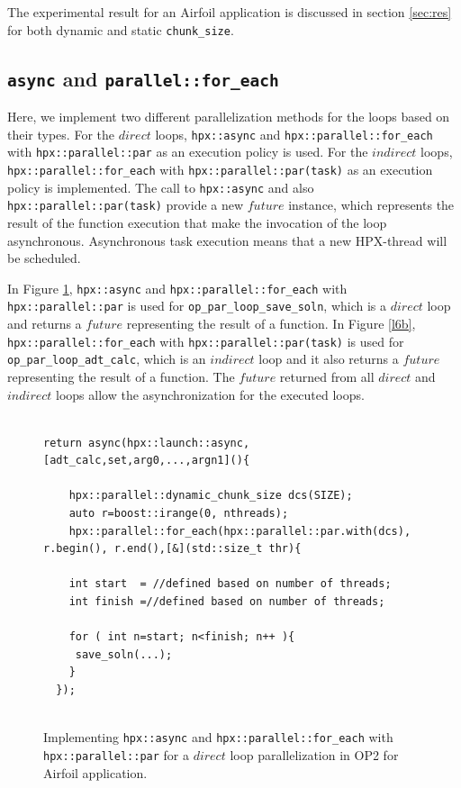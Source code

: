 \documentclass[conference]{IEEEtran}
\begin{document}
The experimental result for an Airfoil application is discussed in section \ref{sec:res} for both dynamic and static \texttt{chunk\_size}.

\subsection{\texttt{async} and \texttt{parallel::for\_each}}
\label{sec:async}

Here, we implement two different parallelization methods for the loops based on their types. For the $direct$ loops, \texttt{hpx::async} and \texttt{hpx::parallel::for\_each} with \texttt{hpx::parallel::par} as an execution policy is used. For  the $indirect$ loops,  \texttt{hpx::parallel::for\_each} with \texttt{hpx::parallel::par(task)} as an execution policy is implemented. The call to \texttt{hpx::async} and also \texttt{hpx::parallel::par(task)} provide a new $future$ instance, which represents the result of the function execution that make the invocation of the loop asynchronous. Asynchronous task execution means that a new HPX-thread will be scheduled. 

In Figure \ref{l6}, \texttt{hpx::async} and \texttt{hpx::parallel::for\_each} with \texttt{hpx::parallel::par} is used for \texttt{op\_par\_loop\_save\_soln}, which is a $direct$ loop and returns a $future$ representing the result of a function. In Figure \ref{l6b},  \texttt{hpx::parallel::for\_each} with \texttt{hpx::parallel::par(task)} is used for \texttt{op\_par\_loop\_adt\_calc}, which is an $indirect$ loop and it also returns a $future$ representing the result of a function. The $future$ returned from all $direct$ and $indirect$ loops allow the asynchronization for the executed loops.

\begin{figure} [!h]
    \begin{lstlisting}    

return async(hpx::launch::async,[adt_calc,set,arg0,...,argn1](){

    hpx::parallel::dynamic_chunk_size dcs(SIZE);
    auto r=boost::irange(0, nthreads);
    hpx::parallel::for_each(hpx::parallel::par.with(dcs), r.begin(), r.end(),[&](std::size_t thr){
  
    int start  = //defined based on number of threads;
    int finish =//defined based on number of threads;
        
    for ( int n=start; n<finish; n++ ){
     save_soln(...);
    }
  });
  
    \end{lstlisting}
    \caption{\small{Implementing \texttt{hpx::async} and \texttt{hpx::parallel::for\_each} with \texttt{hpx::parallel::par} for a $direct$ loop parallelization in OP2 for Airfoil application.}}
    \label{l6}
\end{figure}
\end{document}
